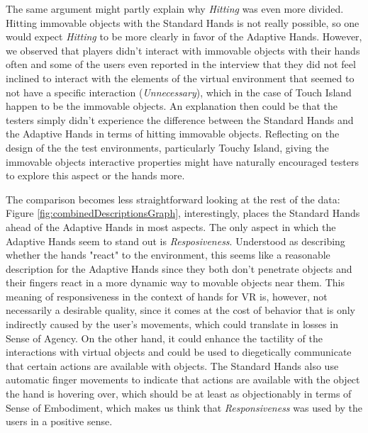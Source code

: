 The same argument might partly explain why \textit{Hitting} was even more divided. Hitting immovable objects with the Standard Hands is not really possible, so one would expect \textit{Hitting} to be more clearly in favor of the Adaptive Hands. However, we observed that players didn't interact with immovable objects with their hands often and some of the users even reported in the interview that they did not feel inclined to interact with the elements of the virtual environment that seemed to not have a specific interaction (\textit{Unnecessary}), which in the case of Touch Island happen to be the immovable objects. An explanation then could be that the testers simply didn't experience the difference between the Standard Hands and the Adaptive Hands in terms of hitting immovable objects. Reflecting on the design of the the test environments, particularly Touchy Island, giving the immovable objects interactive properties might have naturally encouraged testers to explore this aspect or the hands more.




The comparison becomes less straightforward looking at the rest of the data: Figure \ref{fig:combinedDescriptionsGraph}, interestingly, places the Standard Hands ahead of the Adaptive Hands in most aspects. The only aspect in which the Adaptive Hands seem to stand out is \textit{Resposiveness}. Understood as describing whether the hands "react" to the environment, this seems like a reasonable description for the Adaptive Hands since they both don't penetrate objects and their fingers react in a more dynamic way to movable objects near them. This meaning of responsiveness in the context of hands for VR is, however, not necessarily a desirable quality, since it comes at the cost of behavior that is only indirectly caused by the user's movements, which could translate in losses in Sense of Agency. On the other hand, it could enhance the tactility of the interactions with virtual objects and could be used to diegetically communicate that certain actions are available with objects. The Standard Hands also use automatic finger movements to indicate that actions are available with the object the hand is hovering over, which should be at least as objectionably in terms of Sense of Embodiment, which makes us think that \textit{Responsiveness} was used by the users in a positive sense.

